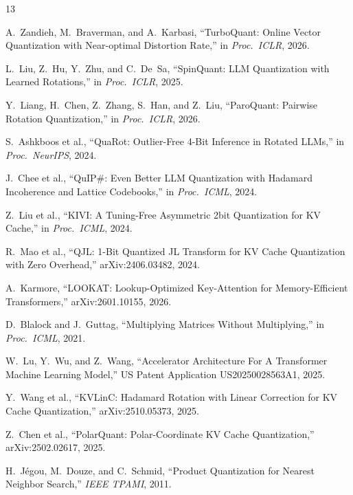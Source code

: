 \documentclass[conference]{IEEEtran}
\begin{document}

\begin{thebibliography}{13}

A.~Zandieh, M.~Braverman, and A.~Karbasi,
``TurboQuant: Online Vector Quantization with Near-optimal Distortion Rate,''
in \emph{Proc.\ ICLR}, 2026.

L.~Liu, Z.~Hu, Y.~Zhu, and C.~De~Sa,
``SpinQuant: LLM Quantization with Learned Rotations,''
in \emph{Proc.\ ICLR}, 2025.

Y.~Liang, H.~Chen, Z.~Zhang, S.~Han, and Z.~Liu,
``ParoQuant: Pairwise Rotation Quantization,''
in \emph{Proc.\ ICLR}, 2026.

S.~Ashkboos et al.,
``QuaRot: Outlier-Free 4-Bit Inference in Rotated LLMs,''
in \emph{Proc.\ NeurIPS}, 2024.

J.~Chee et al.,
``QuIP\#: Even Better LLM Quantization with Hadamard Incoherence and Lattice Codebooks,''
in \emph{Proc.\ ICML}, 2024.

Z.~Liu et al.,
``KIVI: A Tuning-Free Asymmetric 2bit Quantization for KV Cache,''
in \emph{Proc.\ ICML}, 2024.

R.~Mao et al.,
``QJL: 1-Bit Quantized JL Transform for KV Cache Quantization with Zero Overhead,''
arXiv:2406.03482, 2024.

A.~Karmore,
``LOOKAT: Lookup-Optimized Key-Attention for Memory-Efficient Transformers,''
arXiv:2601.10155, 2026.

D.~Blalock and J.~Guttag,
``Multiplying Matrices Without Multiplying,''
in \emph{Proc.\ ICML}, 2021.

W.~Lu, Y.~Wu, and Z.~Wang,
``Accelerator Architecture For A Transformer Machine Learning Model,''
US Patent Application US20250028563A1, 2025.

Y.~Wang et al.,
``KVLinC: Hadamard Rotation with Linear Correction for KV Cache Quantization,''
arXiv:2510.05373, 2025.

Z.~Chen et al.,
``PolarQuant: Polar-Coordinate KV Cache Quantization,''
arXiv:2502.02617, 2025.

H.~J\'{e}gou, M.~Douze, and C.~Schmid,
``Product Quantization for Nearest Neighbor Search,''
\emph{IEEE TPAMI}, 2011.

\end{thebibliography}
\end{document}
